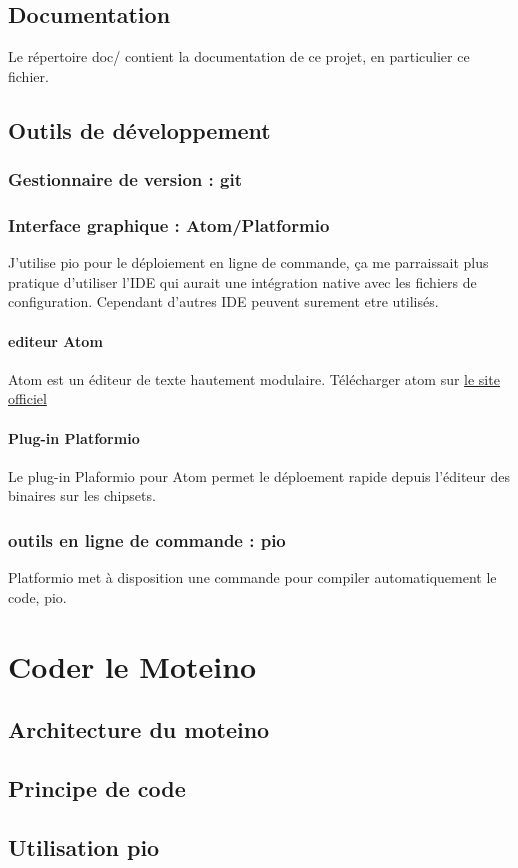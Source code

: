 \documentclass{report}
\begin{document}
\section{Documentation}

Le répertoire doc/ contient la documentation de ce projet, en particulier ce fichier.

\section{Outils de développement}

\subsection{Gestionnaire de version : git}

\subsection{Interface graphique : Atom/Platformio}

J'utilise pio pour le déploiement en ligne de commande, ça me parraissait plus pratique d'utiliser l'IDE qui aurait une intégration native avec les fichiers de configuration. Cependant d'autres IDE peuvent surement etre utilisés.

\subsubsection{editeur Atom}

Atom est un éditeur de texte hautement modulaire.
Télécharger atom sur \href{https://atom.io/}{le site officiel}

\subsubsection{Plug-in Platformio}

Le plug-in Plaformio pour Atom permet le déploement rapide depuis l'éditeur des binaires sur les chipsets.

\subsection{outils en ligne de commande : pio}

Platformio met à disposition une commande pour compiler automatiquement le code, pio.

\chapter{Coder le Moteino}

\section{Architecture du moteino}

\section{Principe de code}

\section{Utilisation pio}
\end{document}
